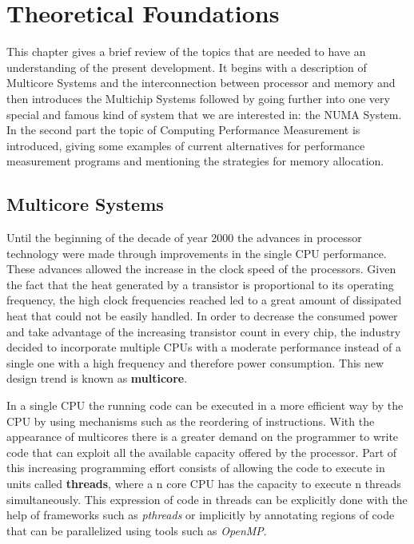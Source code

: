 \chapter{Theoretical Foundations}\label{chapter:theorethical}
This chapter gives a brief review of the topics that are needed to have an understanding of the present development. It begins with a description of Multicore Systems and the interconnection between processor and memory and then introduces the Multichip Systems followed by going further into one very special and famous kind of system that we are interested in: the NUMA System. In the second part  the topic of Computing Performance Measurement is introduced, giving some examples of current alternatives for performance measurement programs and mentioning the strategies for memory allocation.

\section{Multicore Systems}\label{section:multicore}
Until the beginning of the decade of year 2000 the advances in processor technology were made through improvements in the single CPU performance. These advances allowed the increase in the clock speed of the processors. Given the fact that the heat generated by a transistor is proportional to its operating frequency, the high clock frequencies reached led to a great amount of dissipated heat that could not be easily handled. In order to decrease the consumed power and take advantage of the increasing transistor count in every chip, the industry decided to incorporate multiple CPUs with a moderate performance instead of a single one with a high frequency and therefore power consumption. This new design trend is known as \textbf{multicore}. 

In a single CPU the running code can be executed in a more efficient way by the CPU by using mechanisms such as the reordering of instructions. With the appearance of multicores there is a greater demand on the programmer to write code that can exploit all the available capacity offered by the processor. Part of this increasing programming effort consists of allowing the code to execute in units called \textbf{threads}, where a n core CPU has the capacity to execute n threads simultaneously. This expression of code in threads can be explicitly done with the help of frameworks such as \textit{pthreads} or implicitly by annotating regions of code that can be parallelized using tools such as \textit{OpenMP}.

